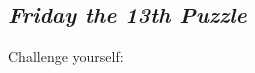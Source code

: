 \subsection{\emph{Friday the 13th Puzzle}}
\label{sub_friday13}

\hspace{-.25in} 
Challenge yourself: